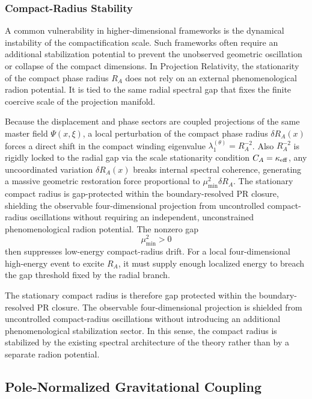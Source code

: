 \documentclass[11pt]{article}
\begin{document}
\subsubsection{Compact-Radius Stability}
\label{sec:compact_radius_stability}

A common vulnerability in higher-dimensional frameworks is the dynamical
instability of the compactification scale. Such frameworks often require an
additional stabilization potential to prevent the unobserved geometric
oscillation or collapse of the compact dimensions. In Projection Relativity, the
stationarity of the compact phase radius \(R_A\) does not rely on an external
phenomenological radion potential. It is tied to the same radial spectral gap
that fixes the finite coercive scale of the projection manifold.

Because the displacement and phase sectors are coupled projections of the same master field $\Psi(x,\xi)$, a local perturbation of the compact phase radius $\delta R_A(x)$ forces a direct shift in the compact winding eigenvalue $\lambda_1^{(\theta)} = R_A^{-2}$. Also $R_A^{-2}$ is rigidly locked to the radial gap via the scale stationarity condition $C_A = \kappa_{\rm eff}$, any uncoordinated variation $\delta R_A(x)$ breaks internal spectral coherence, generating a massive geometric restoration force proportional to $\mu_{\min}^2 \delta R_A$. The stationary compact radius is gap-protected within the boundary-resolved PR closure, shielding the observable four-dimensional projection from uncontrolled compact-radius oscillations without requiring an independent, unconstrained phenomenological radion potential. The nonzero gap
\begin{equation}
\mu_{\min}^2>0
\end{equation}
then suppresses low-energy compact-radius drift. For a local four-dimensional
high-energy event to excite \(R_A\), it must supply enough localized energy to
breach the gap threshold fixed by the radial branch.

The stationary compact radius is therefore gap protected within the
boundary-resolved PR closure. The observable four-dimensional projection is
shielded from uncontrolled compact-radius oscillations without introducing an
additional phenomenological stabilization sector. In this sense, the compact
radius is stabilized by the existing spectral architecture of the theory rather
than by a separate radion potential.

\subsection{Pole-Normalized Gravitational Coupling}
\label{sec:pole_normalized_gravitational_coupling}
\end{document}
